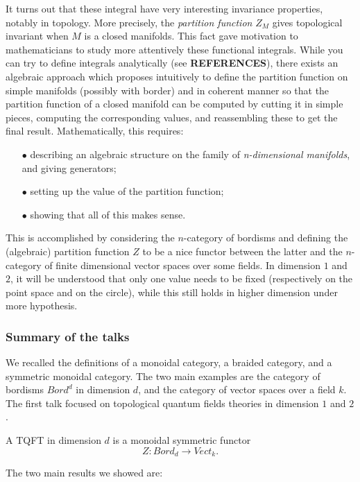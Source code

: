 It turns out that these integral have very interesting invariance properties, notably in topology. More precisely, the \textit{partition function} $Z_M$ gives topological invariant when $M$ is a closed manifolds. This fact gave motivation to mathematicians to study more attentively these functional integrals. While you can try to define integrals analytically (see \textbf{REFERENCES}), there exists an algebraic approach which proposes intuitively to define the partition function on simple manifolds (possibly with border) and in coherent manner so that the partition function of a closed manifold can be computed by cutting it in simple pieces, computing the corresponding values, and reassembling these to get the final result. Mathematically, this requires: 
\begin{itemize}
\item[$\bullet$] describing an algebraic structure on the family of \textit{n-dimensional manifolds}, and giving generators;
\item[$\bullet$] setting up the value of the partition function;
\item[$\bullet$] showing that all of this makes sense.
\end{itemize}
This is accomplished by considering the $n$-category of bordisms and defining the (algebraic) partition function $Z$ to be a nice functor between the latter and the $n$-category of finite dimensional vector spaces over some fields. In dimension $1$ and $2$, it will be understood that only one value needs to be fixed (respectively on the point space and on the circle), while this still holds in higher dimension under more hypothesis.

\subsubsection{Summary of the talks}

We recalled the definitions of a monoidal category, a braided category, and a symmetric monoidal category. The two main examples are the category of bordisms $Bord^d$ in dimension $d$, and the category of vector spaces over a field $k$. The first talk focused on topological quantum fields theories in dimension $1$ and $2$.

\begin{definition} A TQFT in dimension $d$ is a monoidal symmetric functor
\[Z : Bord_d \rightarrow Vect_k.\] 
\end{definition}

The two main results we showed are:\\


